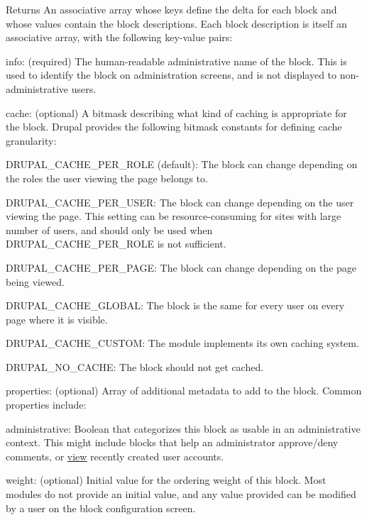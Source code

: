 \begin{DoxyReturn}{Returns}
An associative array whose keys define the delta for each block and whose values contain the block descriptions. Each block description is itself an associative array, with the following key-\/value pairs:
\begin{DoxyItemize}
\item info: (required) The human-\/readable administrative name of the block. This is used to identify the block on administration screens, and is not displayed to non-\/administrative users.
\item cache: (optional) A bitmask describing what kind of caching is appropriate for the block. Drupal provides the following bitmask constants for defining cache granularity:
\begin{DoxyItemize}
\item DRUPAL\_\-CACHE\_\-PER\_\-ROLE (default): The block can change depending on the roles the user viewing the page belongs to.
\item DRUPAL\_\-CACHE\_\-PER\_\-USER: The block can change depending on the user viewing the page. This setting can be resource-\/consuming for sites with large number of users, and should only be used when DRUPAL\_\-CACHE\_\-PER\_\-ROLE is not sufficient.
\item DRUPAL\_\-CACHE\_\-PER\_\-PAGE: The block can change depending on the page being viewed.
\item DRUPAL\_\-CACHE\_\-GLOBAL: The block is the same for every user on every page where it is visible.
\item DRUPAL\_\-CACHE\_\-CUSTOM: The module implements its own caching system.
\item DRUPAL\_\-NO\_\-CACHE: The block should not get cached.
\end{DoxyItemize}
\item properties: (optional) Array of additional metadata to add to the block. Common properties include:
\begin{DoxyItemize}
\item administrative: Boolean that categorizes this block as usable in an administrative context. This might include blocks that help an administrator approve/deny comments, or \hyperlink{classview}{view} recently created user accounts.
\end{DoxyItemize}
\item weight: (optional) Initial value for the ordering weight of this block. Most modules do not provide an initial value, and any value provided can be modified by a user on the block configuration screen.

\end{DoxyItemize}
\end{DoxyReturn}
